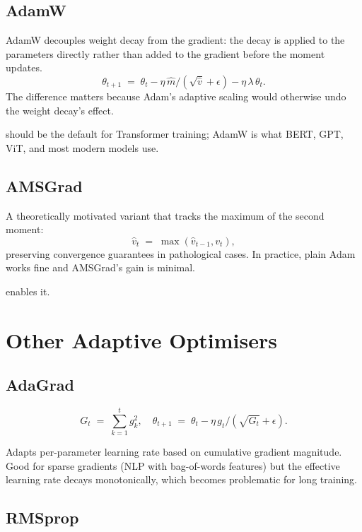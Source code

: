\subsection{AdamW}
\label{ssec:optimizers:adamw}

AdamW \cite{loshchilov_adamw_2019} decouples weight decay from
the gradient: the decay is applied to the parameters directly
rather than added to the gradient before the moment updates.
\[
\theta_{t+1} \;=\; \theta_t - \eta\,\hat m / (\sqrt{\hat v} + \epsilon) - \eta\,\lambda\, \theta_t.
\]
The difference matters because Adam's adaptive scaling would
otherwise undo the weight decay's effect.

 should be the default for Transformer
training; AdamW is what BERT, GPT, ViT, and most modern models
use.

\subsection{AMSGrad}
\label{ssec:optimizers:amsgrad}

A theoretically motivated variant that tracks the maximum of the
second moment:
\[
\hat v_t \;=\; \max(\hat v_{t-1}, v_t),
\]
preserving convergence guarantees in pathological cases. In
practice, plain Adam works fine and AMSGrad's gain is minimal.

 enables it.

\section{Other Adaptive Optimisers}
\label{sec:optimizers:adaptive}

\subsection{AdaGrad}
\label{ssec:optimizers:adagrad}

\[
G_t \;=\; \sum_{k=1}^{t} g_k^2, \quad
\theta_{t+1} \;=\; \theta_t - \eta\, g_t / (\sqrt{G_t} + \epsilon).
\]

Adapts per-parameter learning rate based on cumulative gradient
magnitude. Good for sparse gradients (NLP with bag-of-words
features) but the effective learning rate decays monotonically,
which becomes problematic for long training.

\subsection{RMSprop}
\label{ssec:optimizers:rmsprop}

